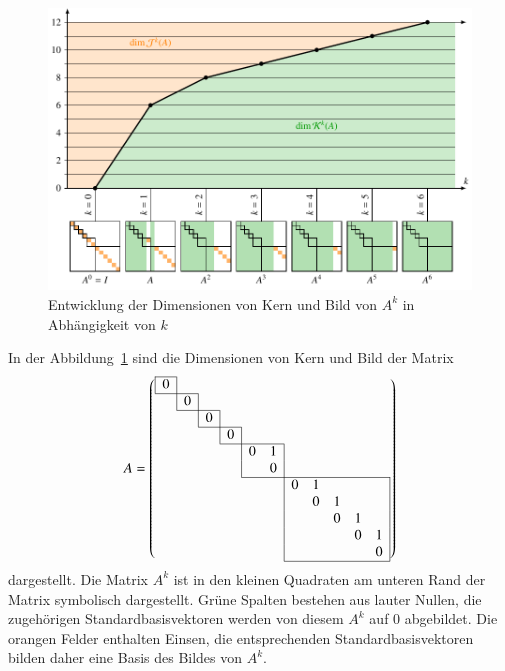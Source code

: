 \begin{figure}
\centering
\includegraphics[width=\textwidth]{chapters/40-eigenwerte/images/jknilp.pdf}
\caption{Entwicklung der Dimensionen von Kern und Bild von $A^k$ in
Abhängigkeit von $k$
\label{buch:eigenwte:fig:jknilp}}
\end{figure}

\begin{beispiel}
In der Abbildung~\ref{buch:eigenwte:fig:jknilp} sind die Dimensionen
von Kern und Bild der Matrix
\[
\def\temp#1{\multicolumn{1}{|c}{$#1\mathstrut$}}
\def\rand#1{\multicolumn{1}{c|}{$#1\mathstrut$}}
\setcounter{MaxMatrixCols}{12}
A=\left(
\begin{array}{ccccccccccc}
\cline{1-1}
\temp{0}&\multicolumn{1}{|c}{}& & & & & & & & & \\
\cline{1-2}
 &\temp{0}&\multicolumn{1}{|c}{}& & & & & & & & \\
\cline{2-3}
 & &\temp{0}&\multicolumn{1}{|c}{}& & & & & & & \\
\cline{3-4}
 & & &\temp{0}&\multicolumn{1}{|c}{}& & & & & & \\
\cline{4-6}
 & & & &\temp{0}&1&\multicolumn{1}{|c}{}& & & & \\
 & & & &\temp{ }&0&\multicolumn{1}{|c}{}& & & & \\
\cline{5-11}
 & & & & & &\temp{0}&1& & &\rand{ }\\
 & & & & & &\temp{ }&0&1& &\rand{ }\\
 & & & & & &\temp{ }& &0&1&\rand{ } \\
 & & & & & &\temp{ }& & &0&\rand{1}\\
 & & & & & &\temp{ }& & & &\rand{0}\\
\cline{7-11}
\end{array}
\right)
\]
dargestellt.
Die Matrix $A^k$ ist in den kleinen Quadraten am unteren Rand der Matrix
symbolisch dargestellt.
Grüne Spalten bestehen aus lauter Nullen, die zugehörigen
Standardbasisvektoren werden von diesem $A^k$ auf $0$ abgebildet.
Die orangen Felder enthalten Einsen, die entsprechenden Standardbasisvektoren
bilden daher eine Basis des Bildes von $A^k$.
\end{beispiel}


